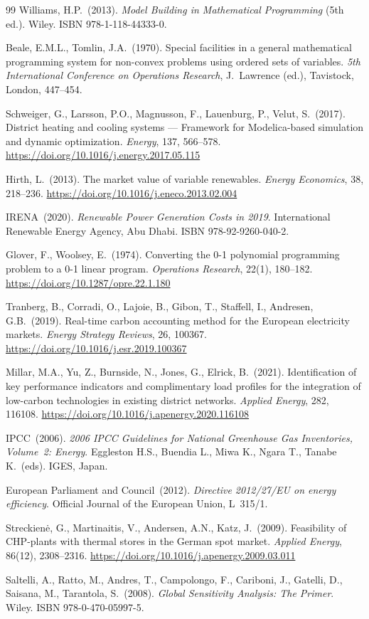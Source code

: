 \documentclass[a4paper,12pt]{article}
\begin{document}
\begin{thebibliography}{99}
Williams, H.P.\ (2013).
\textit{Model Building in Mathematical Programming} (5th ed.). Wiley.
ISBN 978-1-118-44333-0.

Beale, E.M.L., Tomlin, J.A.\ (1970).
Special facilities in a general mathematical programming system for non-convex problems
using ordered sets of variables.
\textit{5th International Conference on Operations Research}, J.\ Lawrence (ed.),
Tavistock, London, 447--454.

Schweiger, G., Larsson, P.O., Magnusson, F., Lauenburg, P., Velut, S.\ (2017).
District heating and cooling systems --- Framework for Modelica-based simulation and
dynamic optimization.
\textit{Energy}, 137, 566--578.
\url{https://doi.org/10.1016/j.energy.2017.05.115}

Hirth, L.\ (2013).
The market value of variable renewables.
\textit{Energy Economics}, 38, 218--236.
\url{https://doi.org/10.1016/j.eneco.2013.02.004}

IRENA\ (2020).
\textit{Renewable Power Generation Costs in 2019}.
International Renewable Energy Agency, Abu Dhabi.
ISBN 978-92-9260-040-2.

Glover, F., Woolsey, E.\ (1974).
Converting the 0-1 polynomial programming problem to a 0-1 linear program.
\textit{Operations Research}, 22(1), 180--182.
\url{https://doi.org/10.1287/opre.22.1.180}

Tranberg, B., Corradi, O., Lajoie, B., Gibon, T., Staffell, I., Andresen, G.B.\ (2019).
Real-time carbon accounting method for the European electricity markets.
\textit{Energy Strategy Reviews}, 26, 100367.
\url{https://doi.org/10.1016/j.esr.2019.100367}

Millar, M.A., Yu, Z., Burnside, N., Jones, G., Elrick, B.\ (2021).
Identification of key performance indicators and complimentary load profiles for the
integration of low-carbon technologies in existing district networks.
\textit{Applied Energy}, 282, 116108.
\url{https://doi.org/10.1016/j.apenergy.2020.116108}

IPCC\ (2006).
\textit{2006 IPCC Guidelines for National Greenhouse Gas Inventories, Volume~2: Energy}.
Eggleston H.S., Buendia L., Miwa K., Ngara T., Tanabe K.\ (eds). IGES, Japan.

European Parliament and Council\ (2012).
\textit{Directive 2012/27/EU on energy efficiency}.
Official Journal of the European Union, L~315/1.

Streckien\.{e}, G., Martinaitis, V., Andersen, A.N., Katz, J.\ (2009).
Feasibility of CHP-plants with thermal stores in the German spot market.
\textit{Applied Energy}, 86(12), 2308--2316.
\url{https://doi.org/10.1016/j.apenergy.2009.03.011}

Saltelli, A., Ratto, M., Andres, T., Campolongo, F., Cariboni, J., Gatelli, D.,
Saisana, M., Tarantola, S.\ (2008).
\textit{Global Sensitivity Analysis: The Primer}. Wiley.
ISBN 978-0-470-05997-5.

\end{thebibliography}
\end{document}
